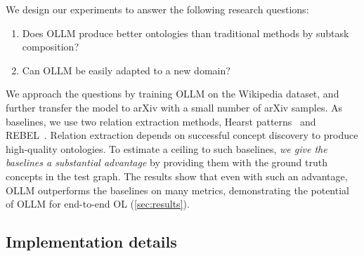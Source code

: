 \documentclass{article}
\newcommand{\name}{{OLLM}\xspace}
\begin{document}
We design our experiments to answer the following research questions:
\begin{enumerate}[itemsep=0pt,leftmargin=*]
    \item Does \name produce better ontologies than traditional methods by subtask composition?
    \item Can \name be easily adapted to a new domain?
\end{enumerate}
 We approach the questions by training \name on the Wikipedia dataset, and further transfer the model to arXiv with a small number of arXiv samples. As baselines, we use two relation extraction methods, Hearst patterns~\cite{hearst1998automated,roller2018hearst} and REBEL~\cite{cabot2021rebel}. Relation extraction depends on successful concept discovery to produce high-quality ontologies. To estimate a ceiling to such baselines, \emph{we give the baselines a substantial advantage} by providing them with the ground truth concepts in the test graph. The results show that even with such an advantage, \name outperforms the baselines on many metrics, demonstrating the potential of \name for end-to-end OL (\cref{sec:results}).

\subsection{Implementation details}  \label{sec:implementation}




\end{document}
